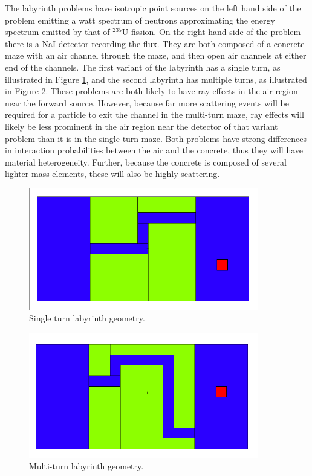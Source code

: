 The labyrinth problems have isotropic point sources on the left hand side of the
problem emitting a watt spectrum of
neutrons approximating the energy spectrum emitted by that of $^{235}$U fission.
On the right hand side of the problem there is a NaI detector recording the flux.
They are both composed of a concrete maze with an air channel through the maze, and
then open air channels at either end of the channels. The first variant of the
labyrinth has a single turn, as illustrated in Figure \ref{fig:maze2geom}, and
the second labyrinth has multiple turns, as illustrated in Figure
\ref{fig:maze1geom}. These problems are both
likely to have ray effects in the air region near the forward source. However,
because far more scattering events will be required for a particle to exit the
channel in the multi-turn maze, ray effects will likely be less prominent in the
air region near the detector of that variant problem than it is in the single
turn maze. Both problems have strong
differences in interaction probabilities between the air and the concrete,
thus they will have material heterogeneity. Further, because the concrete is
composed of several lighter-mass elements, these will also be highly scattering.

\begin{figure}[h!]
  \centering
  \includegraphics[width=10cm]{./chapters/characterization_probs/figures/geometries/maze2.png}
  \caption[Single turn labyrinth geometry.]{Single turn labyrinth geometry.}
  \label{fig:maze2geom}
\end{figure}

\begin{figure}[h!]
  \centering
  \includegraphics[width=10cm]{./chapters/characterization_probs/figures/geometries/maze1.png}
  \caption[Multi-turn labyrinth geometry.]{Multi-turn labyrinth geometry.}
  \label{fig:maze1geom}
\end{figure}


